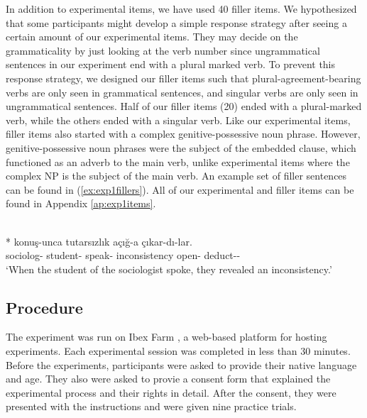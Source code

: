 In addition to experimental items, we have used 40 filler items. We hypothesized that some participants might develop a simple response strategy after seeing a certain amount of our experimental items. They may decide on the grammaticality by just looking at the verb number since ungrammatical sentences in our experiment end with a plural marked verb. To prevent this response strategy, we designed our filler items such that plural-agreement-bearing verbs are only seen in grammatical sentences, and singular verbs are only seen in ungrammatical sentences. Half of our filler items (20) ended with a plural-marked verb, while the others ended with a singular verb. Like our experimental items, filler items also started with a complex genitive-possessive noun phrase. However, genitive-possessive noun phrases were the subject of the embedded clause, which functioned as an adverb to the main verb, unlike experimental items where the complex NP is the subject of the main verb. An example set of filler sentences can be found in (\ref{ex:exp1fillers}). All of our experimental and filler items can be found in Appendix \ref{ap:exp1items}.


\ea \label{ex:exp1fillers}
     \label{ex:exp1_gram_filler}\\*
     konu\c{s}-unca tutars{\i}zl{\i}k a\c{c}{\i}\u{g}-a \c{c}{\i}kar-d{\i}-lar.\\ 
    sociolog-\Gen{}  student-\Poss{} speak-\When{} inconsistency  open-\Dat{} deduct-\Pst-\Pl{}\\
    \glt `When the student of the sociologist spoke, they revealed an inconsistency.'
    \z
\z




\subsection{Procedure}

The experiment was run on Ibex Farm \citep{Drummond2013}, a web-based platform for hosting experiments. Each experimental session was completed in less than 30 minutes. Before the experiments, participants were asked to provide their native language and age. They also were asked to provie a consent form that explained the experimental process and their rights in detail. After the consent, they were presented with the instructions and were given nine practice trials.

